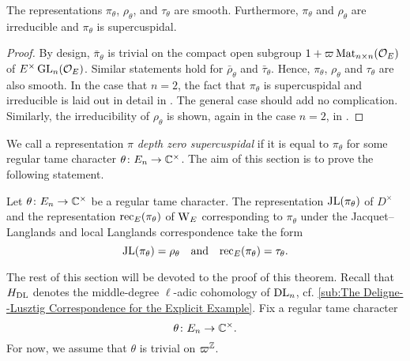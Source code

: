 \documentclass[../main.tex]{subfiles}
\begin{document}
\begin{lem}\label{lem:BarRepsAreSmooth}
  The representations $\pi_\theta$, $\rho_\theta$, and $\tau_\theta$ are smooth. 
  Furthermore, $\pi_\theta$ and $\rho_\theta$ are irreducible and $\pi_\theta$ is supercuspidal.
  \begin{proof}
    By design, $\bar \pi_\theta$ is trivial on the compact open subgroup $1 +
    \varpi \operatorname{Mat}_{n \times n}(\mathcal{O}_E)$ of $E^\times \operatorname{GL}_n(\mathcal{O}_E)$. Similar statements hold for $\bar \rho_\theta$ and $\bar \tau_\theta$. Hence,
    $\pi_\theta$, $\rho_\theta$ and $\tau_\theta$ are also smooth. 
    In the case that $n=2$, the fact that $\pi_\theta$ is supercuspidal and
    irreducible is laid out in detail in \cite[Section 11]{bushnell2006local}.
    The general case should add no complication. 
    Similarly, the irreducibility of $\rho_\theta$ is shown, again in the case 
    $n=2$, in \cite[Section 54]{bushnell2006local}. 
  \end{proof}
\end{lem}

We call a representation $\pi$ \emph{depth zero supercuspidal} if it is equal
to $\pi_\theta$ for some regular tame character $\theta \colon E_n \to \mathbb{C}^\times$. 
The aim of this section is to prove the following statement.
\begin{thm}\label{thm:MainRes1}
  Let $\theta\colon E_n \to \mathbb{C}^\times$ be a regular tame character.
  The representation $\mathrm{JL}(\pi_\theta)$ of $D^\times$ and the representation
  $\mathrm{rec}_E(\pi_\theta)$ of $\mathrm W_E$ corresponding to $\pi_\theta$ under the
  Jacquet--Langlands and local Langlands correspondence take the form
  \begin{equation*}
    \mathrm{JL}(\pi_\theta) = \rho_{\theta}
    \quad \text{and} \quad \mathrm{rec}_E(\pi_\theta) = \tau_\theta.
  \end{equation*}
\end{thm}

The rest of this section will be devoted to the proof of this theorem. 
Recall that $H_{\mathrm{DL}}$ denotes the middle-degree $\ell$-adic cohomology of 
$\mathrm{DL}_n$, cf. \cref{sub:The Deligne--Lusztig Correspondence for the
Explicit Example}. Fix a regular tame character
$$\theta\colon E_n \to \mathbb{C}^\times.$$ For now, we assume that $\theta$ is
trivial on $\varpi^{\mathbb{Z}}$. 
\end{document}
